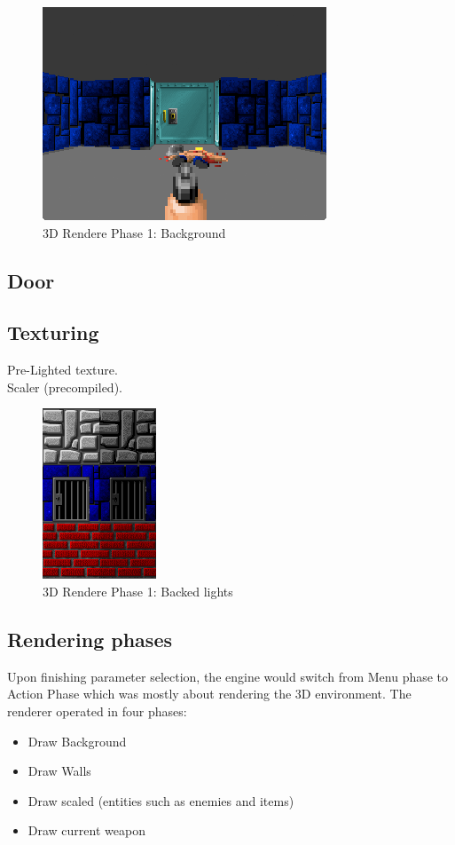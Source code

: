 \documentclass[book.tex]{subfiles}
\begin{document}
  \begin{figure}[H]
\centering
 \includegraphics[scale=1.3]{imgs/fish_eye/fish_eyed_start_screen2.png}
 \caption{3D Rendere Phase 1: Background} \label{fig:mips}
 \end{figure}
\subsection{Door}
\subsection{Texturing}
Pre-Lighted texture.\\
Scaler (precompiled).\\
  \begin{figure}[H]
\centering
 \includegraphics[scale=3.3]{imgs/baked_lights.png}
 \caption{3D Rendere Phase 1: Backed lights} \label{fig:backee_lights}
 \end{figure}

\subsection{Rendering phases}

Upon finishing parameter selection, the engine would switch from Menu phase to Action Phase which was mostly about rendering the 3D environment. The renderer operated in four phases:
\begin{itemize}
   \item Draw Background
   \item Draw Walls
   \item Draw scaled (entities such as enemies and items)
   \item Draw current weapon
\end{itemize}
\end{document}
